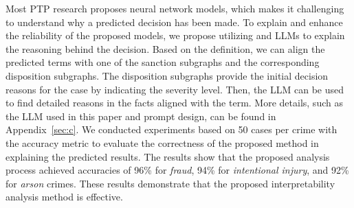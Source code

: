 Most PTP research proposes neural network models, which makes it challenging to understand why a predicted decision has been made. To explain and enhance the reliability of the proposed models, we propose utilizing \lawgraph{} and LLMs to explain the reasoning behind the decision. Based on the \lawgraph{} definition, we can align the predicted terms with one of the sanction subgraphs and the corresponding disposition subgraphs. The disposition subgraphs provide the initial decision reasons for the case by indicating the severity level. Then, the LLM can be used to find detailed reasons in the facts aligned with the term. More details, such as the LLM used in this paper and prompt design, can be found in Appendix~\ref{sec:c}. We conducted experiments based on 50 cases per crime with the accuracy metric to evaluate the correctness of the proposed method in explaining the predicted results. The results show that the proposed analysis process achieved accuracies of 96\% for \textit{fraud}, 94\% for \textit{intentional injury}, and 92\% for \textit{arson} crimes. These results demonstrate that the proposed interpretability analysis method is effective.
